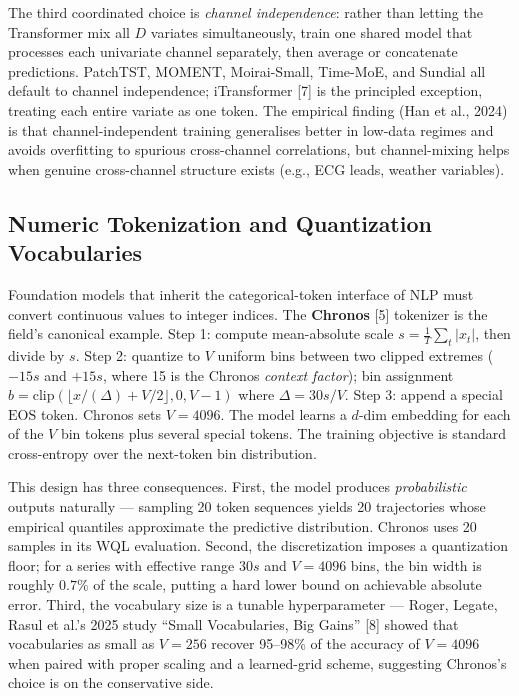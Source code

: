 \documentclass{article}
\begin{document}
The third coordinated choice is \emph{channel independence}: rather than letting the Transformer mix all \(D\) variates simultaneously, train one shared model that processes each univariate channel separately, then average or concatenate predictions. PatchTST, MOMENT, Moirai-Small, Time-MoE, and Sundial all default to channel independence; iTransformer {[}7{]} is the principled exception, treating each entire variate as one token. The empirical finding (Han et al., 2024) is that channel-independent training generalises better in low-data regimes and avoids overfitting to spurious cross-channel correlations, but channel-mixing helps when genuine cross-channel structure exists (e.g., ECG leads, weather variables).

\subsection{Numeric Tokenization and Quantization Vocabularies}\label{numeric-tokenization-and-quantization-vocabularies}

Foundation models that inherit the categorical-token interface of NLP must convert continuous values to integer indices. The \textbf{Chronos} {[}5{]} tokenizer is the field's canonical example. Step 1: compute mean-absolute scale \(s = \frac{1}{T}\sum_t |x_t|\), then divide by \(s\). Step 2: quantize to \(V\) uniform bins between two clipped extremes (\(-15s\) and \(+15s\), where 15 is the Chronos \emph{context factor}); bin assignment \(b = \mathrm{clip}(\lfloor x/(\Delta) + V/2 \rfloor, 0, V-1)\) where \(\Delta = 30s/V\). Step 3: append a special \(\mathrm{EOS}\) token. Chronos sets \(V = 4096\). The model learns a \(d\)-dim embedding for each of the \(V\) bin tokens plus several special tokens. The training objective is standard cross-entropy over the next-token bin distribution.

This design has three consequences. First, the model produces \emph{probabilistic} outputs naturally --- sampling 20 token sequences yields 20 trajectories whose empirical quantiles approximate the predictive distribution. Chronos uses 20 samples in its WQL evaluation. Second, the discretization imposes a quantization floor; for a series with effective range \(30s\) and \(V=4096\) bins, the bin width is roughly \(0.7\%\) of the scale, putting a hard lower bound on achievable absolute error. Third, the vocabulary size is a tunable hyperparameter --- Roger, Legate, Rasul et al.'s 2025 study ``Small Vocabularies, Big Gains'' {[}8{]} showed that vocabularies as small as \(V=256\) recover 95--98\% of the accuracy of \(V=4096\) when paired with proper scaling and a learned-grid scheme, suggesting Chronos's choice is on the conservative side.
\end{document}
